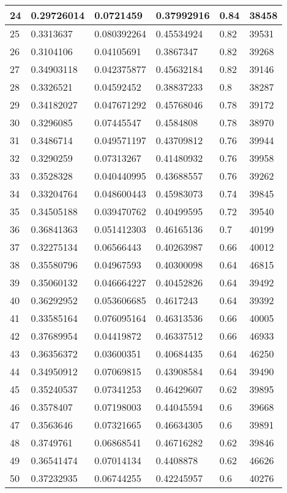 \begin{longtable}{|l|l|l|l|l|l|}
24 & 0.29726014 & 0.0721459 & 0.37992916 & 0.84 & 38458 \\ \hline 
25 & 0.3313637 & 0.080392264 & 0.45534924 & 0.82 & 39531 \\ \hline 
26 & 0.3104106 & 0.04105691 & 0.3867347 & 0.82 & 39268 \\ \hline 
27 & 0.34903118 & 0.042375877 & 0.45632184 & 0.82 & 39146 \\ \hline 
28 & 0.3326521 & 0.04592452 & 0.38837233 & 0.8 & 38287 \\ \hline 
29 & 0.34182027 & 0.047671292 & 0.45768046 & 0.78 & 39172 \\ \hline 
30 & 0.3296085 & 0.07445547 & 0.4584808 & 0.78 & 38970 \\ \hline 
31 & 0.3486714 & 0.049571197 & 0.43709812 & 0.76 & 39944 \\ \hline 
32 & 0.3290259 & 0.07313267 & 0.41480932 & 0.76 & 39958 \\ \hline 
33 & 0.3528328 & 0.040440995 & 0.43688557 & 0.76 & 39262 \\ \hline 
34 & 0.33204764 & 0.048600443 & 0.45983073 & 0.74 & 39845 \\ \hline 
35 & 0.34505188 & 0.039470762 & 0.40499595 & 0.72 & 39540 \\ \hline 
36 & 0.36841363 & 0.051412303 & 0.46165136 & 0.7 & 40199 \\ \hline 
37 & 0.32275134 & 0.06566443 & 0.40263987 & 0.66 & 40012 \\ \hline 
38 & 0.35580796 & 0.04967593 & 0.40300098 & 0.64 & 46815 \\ \hline 
39 & 0.35060132 & 0.046664227 & 0.40452826 & 0.64 & 39492 \\ \hline 
40 & 0.36292952 & 0.053606685 & 0.4617243 & 0.64 & 39392 \\ \hline 
41 & 0.33585164 & 0.076095164 & 0.46313536 & 0.66 & 40005 \\ \hline 
42 & 0.37689954 & 0.04419872 & 0.46337512 & 0.66 & 46933 \\ \hline 
43 & 0.36356372 & 0.03600351 & 0.40684435 & 0.64 & 46250 \\ \hline 
44 & 0.34950912 & 0.07069815 & 0.43908584 & 0.64 & 39490 \\ \hline 
45 & 0.35240537 & 0.07341253 & 0.46429607 & 0.62 & 39895 \\ \hline 
46 & 0.3578407 & 0.07198003 & 0.44045594 & 0.6 & 39668 \\ \hline 
47 & 0.3563646 & 0.07321665 & 0.46634305 & 0.6 & 39891 \\ \hline 
48 & 0.3749761 & 0.06868541 & 0.46716282 & 0.62 & 39846 \\ \hline 
49 & 0.36541474 & 0.07014134 & 0.4408878 & 0.62 & 46626 \\ \hline 
50 & 0.37232935 & 0.06744255 & 0.42245957 & 0.6 & 40276 \\ \hline 
\end{longtable}